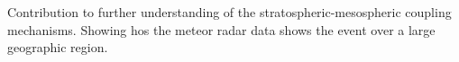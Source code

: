 Contribution to further understanding of the stratospheric-mesospheric coupling mechanisms. Showing hos the meteor radar data shows the event over a large geographic region.